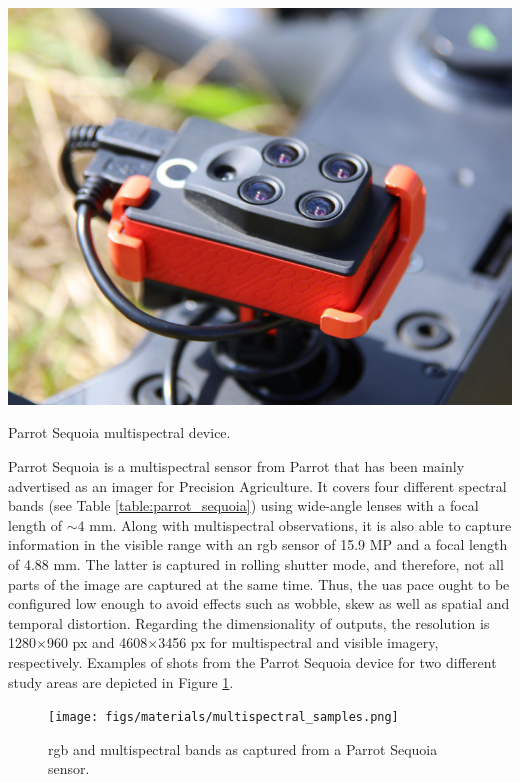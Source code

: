 \begin{marginfigure}[.2cm]
	\includegraphics{figs/materials/sequoia_parrot.jpg}
	\caption{Parrot Sequoia multispectral device.}
	\label{fig:parrot_sequoia}
\end{marginfigure}
Parrot Sequoia is a multispectral sensor from Parrot that has been mainly advertised as an imager for Precision Agriculture. It covers four different spectral bands (see Table \ref{table:parrot_sequoia}) using wide-angle lenses with a focal length of $\sim4$ \si{\milli\meter}. Along with multispectral observations, it is also able to capture information in the visible range with an \acrshort{rgb} sensor of 15.9 MP and a focal length of 4.88 \si{\milli\meter}. The latter is captured in rolling shutter mode, and therefore, not all parts of the image are captured at the same time. Thus, the \acrshort{uas} pace ought to be configured low enough to avoid effects such as wobble, skew as well as spatial and temporal distortion. Regarding the dimensionality of outputs, the resolution is 1280$\times$960 px and 4608$\times$3456 px for multispectral and visible imagery, respectively. Examples of shots from the Parrot Sequoia device for two different study areas are depicted in Figure \ref{fig:multispectral_samples}. 

\begin{figure}[ht]
	\texttt{[image: figs/materials/multispectral\_samples.png]}
	\caption{\acrshort{rgb} and multispectral bands as captured from a Parrot Sequoia sensor.}
	\label{fig:multispectral_samples}
\end{figure}

